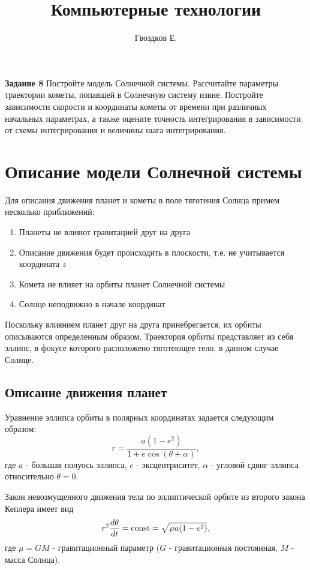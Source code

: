 


\title{Компьютерные технологии}
\author{Гвоздков Е.}




\maketitle

\textbf{Задание 8} Постройте модель Солнечной системы. Рассчитайте параметры траектории кометы,
попавшей в Солнечную систему извне. Постройте зависимости скорости и координаты кометы
от времени при различных начальных параметрах, а также оцените точность интегрирования в
зависимости от схемы интегрирования и величины шага интегрирования.

\section{Описание модели Солнечной системы}
Для описания движения планет и кометы в поле тяготения Солнца примем несколько приближений:
\begin{enumerate}
	\item Планеты не влияют гравитацией друг на друга
	\item Описание движения будет происходить в плоскости, т.е. не учитывается координата $z$
	\item Комета не влияет на орбиты планет Солнечной системы
	\item Солнце неподвижно в начале координат
\end{enumerate}
Поскольку влиянием планет друг на друга принебрегается, их орбиты описываются определенным образом.
Траектория орбиты представляет из себя эллипс, в фокусе которого расположено тяготеющее тело, в данном случае Солнце.

\subsection{Описание движения планет}
Уравнение эллипса орбиты в полярных координатах задается следующим образом:
\begin{equation}
	r = \frac{a(1-e^2)}{1 + e \cos(\theta + \alpha)},
\end{equation}
где $a$ - большая полуось эллипса, $e$ - эксцентриситет, $\alpha$ - угловой сдвиг
эллипса относительно $\theta=0$.

Закон невозмущенного движения тела по эллиптической орбите из второго закона Кеплера имеет вид
\begin{equation}
	r^2\frac{d\theta}{d t} = \text{\rmfamily\upshape const} = \sqrt{\mu a (1-e^2)},
\end{equation}
где $\mu = GM$ - гравитационный параметр ($G$ - гравитационная постоянная, $M$ - масса Солнца).

